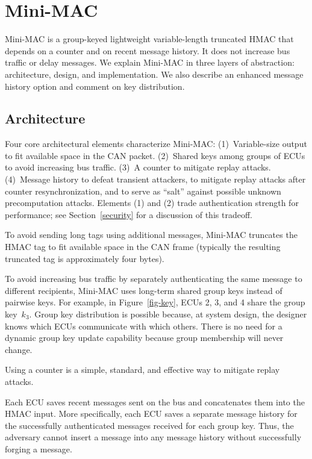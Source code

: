 \section{Mini-MAC}
\label{mini-mac}

Mini-MAC is a group-keyed lightweight variable-length truncated HMAC that
depends on a counter and on recent message history.  It does not increase
bus traffic or delay messages.  We explain Mini-MAC in three layers
of abstraction: architecture, design, and  implementation.
We also describe an enhanced message history option
and comment on key distribution.

\subsection{Architecture}
\label{arch}

Four core architectural elements characterize Mini-MAC:
(1)~Variable-size output to fit available space in the CAN packet.
(2)~Shared keys among groups of ECUs to avoid increasing bus traffic.
(3)~A counter to mitigate replay attacks.
(4)~Message history to defeat transient attackers, 
to mitigate replay attacks after counter resynchronization, 
and to serve as ``salt'' against possible unknown precomputation attacks.
Elements (1) and (2) trade authentication strength for performance;  see
Section~\ref{security} for a discussion of this tradeoff.

To avoid sending long tags using additional messages, Mini-MAC truncates the
HMAC tag to fit available space in the CAN frame 
(typically the resulting truncated tag is approximately four bytes).  

To avoid increasing bus traffic by separately authenticating the same message to different recipients, 
Mini-MAC uses long-term shared group keys instead of pairwise keys.  For example, in Figure~\ref{fig-key}, ECUs
2, 3, and 4 share the group key~$k_3$.
Group key distribution is possible because, at system design, the designer knows which ECUs communicate with which others. 
There is no need for a dynamic group key update capability because group membership will never change.

Using a counter is a simple, standard, and effective way to mitigate replay attacks.  

Each ECU saves recent messages sent on the bus and concatenates them into the HMAC input. 
More specifically, each ECU saves a separate message history for the 
successfully authenticated messages received for each group key.  
Thus, the adversary cannot insert a message into any message history without 
successfully forging a message.

